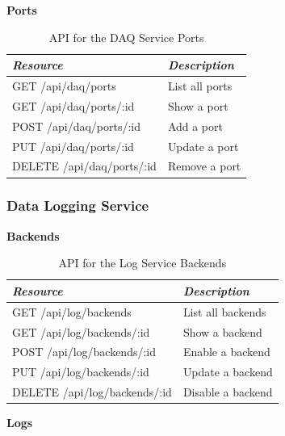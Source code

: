       \large{\textbf{Ports}}

      \begin{table}[H]
        \centering
        \begin{tabular}{p{3in} p{3in}}
          \toprule
          \emph{Resource} & \emph{Description} \\ [0.5ex]
          \midrule
          GET /api/daq/ports & List all ports \\
          GET /api/daq/ports/:id & Show a port \\
          POST /api/daq/ports/:id & Add a port \\
          PUT /api/daq/ports/:id & Update a port \\
          DELETE /api/daq/ports/:id & Remove a port \\
          \bottomrule
        \end{tabular}
        \caption{API for the DAQ Service Ports}\label{tab:rest-daq-port}
      \end{table}

    \subsubsection{Data Logging Service}\label{sec:rest-log}

      \large{\textbf{Backends}}

      \begin{table}[H]
        \centering
        \begin{tabular}{p{3in} p{3in}}
          \toprule
          \emph{Resource} & \emph{Description} \\ [0.5ex]
          \midrule
          GET /api/log/backends & List all backends \\
          GET /api/log/backends/:id & Show a backend \\
          POST /api/log/backends/:id & Enable a backend \\
          PUT /api/log/backends/:id & Update a backend \\
          DELETE /api/log/backends/:id & Disable a backend \\
          \bottomrule
        \end{tabular}
        \caption{API for the Log Service Backends}\label{tab:rest-log-backend}
      \end{table}

      \large{\textbf{Logs}}

